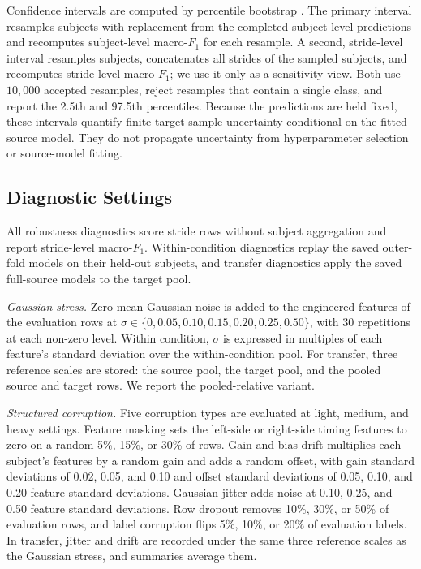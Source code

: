 \documentclass[conference]{IEEEtran}
\begin{document}
Confidence intervals are computed by percentile bootstrap \cite{efron1993bootstrap}. The primary interval resamples subjects with replacement from the completed subject-level predictions and recomputes subject-level macro-$F_1$ for each resample. A second, stride-level interval resamples subjects, concatenates all strides of the sampled subjects, and recomputes stride-level macro-$F_1$; we use it only as a sensitivity view. Both use $10{,}000$ accepted resamples, reject resamples that contain a single class, and report the 2.5th and 97.5th percentiles. Because the predictions are held fixed, these intervals quantify finite-target-sample uncertainty conditional on the fitted source model. They do not propagate uncertainty from hyperparameter selection or source-model fitting.

\subsection{Diagnostic Settings}
\label{sec:setup-diagnostics}
All robustness diagnostics score stride rows without subject aggregation and report stride-level macro-$F_1$. Within-condition diagnostics replay the saved outer-fold models on their held-out subjects, and transfer diagnostics apply the saved full-source models to the target pool.

\textit{Gaussian stress.} Zero-mean Gaussian noise is added to the engineered features of the evaluation rows at $\sigma \in \{0, 0.05, 0.10, 0.15, 0.20, 0.25, 0.50\}$, with 30 repetitions at each non-zero level. Within condition, $\sigma$ is expressed in multiples of each feature's standard deviation over the within-condition pool. For transfer, three reference scales are stored: the source pool, the target pool, and the pooled source and target rows. We report the pooled-relative variant.

\textit{Structured corruption.} Five corruption types are evaluated at light, medium, and heavy settings. Feature masking sets the left-side or right-side timing features to zero on a random 5\%, 15\%, or 30\% of rows. Gain and bias drift multiplies each subject's features by a random gain and adds a random offset, with gain standard deviations of 0.02, 0.05, and 0.10 and offset standard deviations of 0.05, 0.10, and 0.20 feature standard deviations. Gaussian jitter adds noise at 0.10, 0.25, and 0.50 feature standard deviations. Row dropout removes 10\%, 30\%, or 50\% of evaluation rows, and label corruption flips 5\%, 10\%, or 20\% of evaluation labels. In transfer, jitter and drift are recorded under the same three reference scales as the Gaussian stress, and summaries average them.
\end{document}
